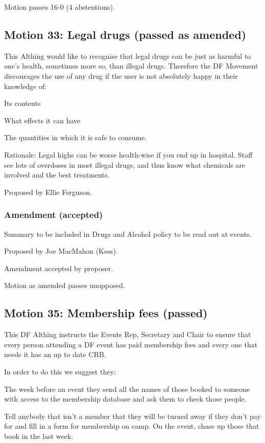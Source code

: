 \documentclass[a4paper, 12pt]{article}
\begin{document}
Motion passes 16-0 (4 abstentions).

\subsection{Motion 33: Legal drugs (passed as amended)}
This Althing would like to recognise that legal drugs can be just as harmful to one's health, sometimes more so, than illegal drugs. Therefore the DF Movement discourages the use of any drug if the user is not absolutely happy in their knowledge of:
\begin{enumerate*}
	\item Its contents
	\item What effects it can have
	\item The quantities in which it is safe to consume.
\end{enumerate*}

Rationale: Legal highs can be worse health-wise if you end up in hospital. Staff see lots of overdoses in most illegal drugs, and thus know what chemicals are involved and the best treatments.

Proposed by Ellie Ferguson.

\subsubsection{Amendment (accepted)}
Summary to be included in Drugs and Alcohol policy to be read out at events.

Proposed by Joe MacMahon (Kess).

Amendment accepted by proposer.

Motion as amended passes unopposed.

\subsection{Motion 35: Membership fees (passed)}
This DF Althing instructs the Events Rep, Secretary and Chair to ensure that every person attending a DF event has paid membership fees and every one that needs it has an up to date CRB.

In order to do this we suggest they:
\begin{enumerate*}
	\item The week before an event they send all the names of those booked to someone with access to the membership database and ask them to check those people.
	\item Tell anybody that isn't a member that they will be turned away if they don't pay for and fill in a form for membership on camp. On the event, chase up those that book in the last week.
\end{enumerate*}
\end{document}
